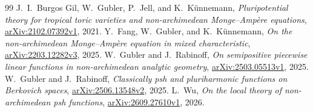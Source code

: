 \documentclass[11pt]{amsart}
\theoremstyle{definition}
\theoremstyle{remark}
\numberwithin{equation}{section}
\begin{document}
\begin{thebibliography}{99}
J.~I.~Burgos Gil, W.~Gubler, P.~Jell, and K.~K\"unnemann,
\emph{Pluripotential theory for tropical toric varieties and
non-archimedean Monge--Amp\`ere equations},
\href{https://arxiv.org/abs/2102.07392v1}{arXiv:2102.07392v1}, 2021.
Y.~Fang, W.~Gubler, and K.~K\"unnemann,
\emph{On the non-archimedean Monge--Amp\`ere equation in mixed
characteristic},
\href{https://arxiv.org/abs/2203.12282v3}{arXiv:2203.12282v3}, 2025.
W.~Gubler and J.~Rabinoff,
\emph{On semipositive piecewise linear functions in non-archimedean
analytic geometry},
\href{https://arxiv.org/abs/2503.05513v1}{arXiv:2503.05513v1}, 2025.
W.~Gubler and J.~Rabinoff,
\emph{Classically psh and pluriharmonic functions on Berkovich spaces},
\href{https://arxiv.org/abs/2506.13548v2}{arXiv:2506.13548v2}, 2025.
L.~Wu,
\emph{On the local theory of non-archimedean psh functions},
\href{https://arxiv.org/abs/2609.27610v1}{arXiv:2609.27610v1}, 2026.
\end{thebibliography}
\end{document}
